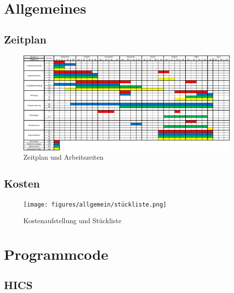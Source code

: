 \appendix
\chapter{Allgemeines}

\newpage

\section{Zeitplan}

\begin{figure} [H]
	\begin{center}
		\includegraphics[angle=90, scale=0.6] {figures/allgemein/zeitplan.png}
		\caption{Zeitplan und Arbeitszeiten}
		\label{fig:Zeitplan}
	\end{center}
\end{figure}

\newpage

\section{Kosten}


\begin{figure} [H]
	\begin{center}
		\texttt{[image: figures/allgemein/stückliste.png]}
		\caption{Kostenaufstellung und Stückliste}
		\label{fig:Stückliste}
	\end{center}
\end{figure}

\newpage

\chapter{Programmcode}

\section{HICS}

